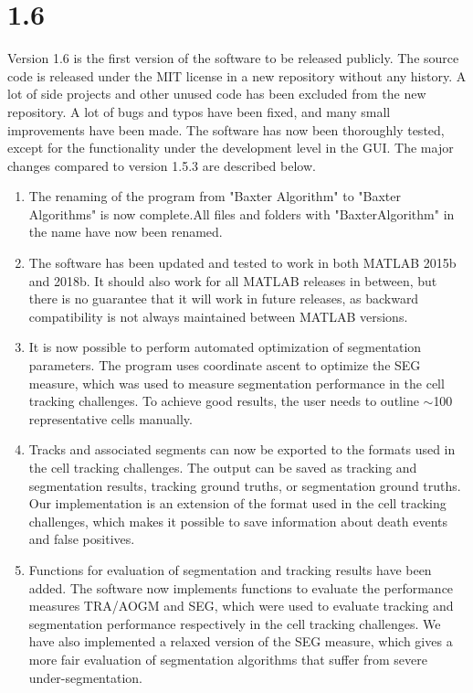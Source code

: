 \documentclass[a4paper, oneside, onecolumn, 11pt]{article}
\begin{document}
\section*{1.6}
Version 1.6 is the first version of the software to be released publicly. The source code is released under the MIT license in a new repository without any history. A lot of side projects and other unused code has been excluded from the new repository. A lot of bugs and typos have been fixed, and many small improvements have been made. The software has now been thoroughly tested, except for the functionality under the development level in the GUI. The major changes compared to version 1.5.3 are described below.

\begin{enumerate}
\item The renaming of the program from "Baxter Algorithm" to "Baxter Algorithms" is now complete.All files and folders with "BaxterAlgorithm" in the name have now been renamed.
\item The software has been updated and tested to work in both MATLAB 2015b and 2018b. It should also work for all MATLAB releases in between, but there is no guarantee that it will work in future releases, as backward compatibility is not always maintained between MATLAB versions.
\item It is now possible to perform automated optimization of segmentation parameters. The program uses coordinate ascent to optimize the SEG measure, which was used to measure segmentation performance in the cell tracking challenges. To achieve good results, the user needs to outline $\sim$100 representative cells manually.
\item Tracks and associated segments can now be exported to the formats used in the cell tracking challenges. The output can be saved as tracking and segmentation results, tracking ground truths, or segmentation ground truths. Our implementation is an extension of the format used in the cell tracking challenges, which makes it possible to save information about death events and false positives.
\item Functions for evaluation of segmentation and tracking results have been added. The software now implements functions to evaluate the performance measures TRA/AOGM and SEG, which were used to evaluate tracking and segmentation performance respectively in the cell tracking challenges. We have also implemented a relaxed version of the SEG measure, which gives a more fair evaluation of segmentation algorithms that suffer from severe under-segmentation.

\end{enumerate}
\end{document}

